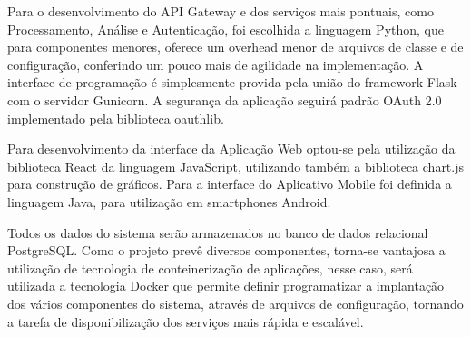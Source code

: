 Para o desenvolvimento do API Gateway e dos serviços mais pontuais, como Processamento, Análise e Autenticação, foi escolhida a linguagem Python, que para componentes menores, oferece um overhead menor de arquivos de classe e de configuração, conferindo um pouco mais de agilidade na implementação. A interface de programação é simplesmente provida pela união do framework Flask com o servidor Gunicorn. A segurança da aplicação seguirá padrão OAuth 2.0 implementado pela biblioteca oauthlib.


Para desenvolvimento da interface da Aplicação Web optou-se pela utilização da biblioteca React da linguagem JavaScript, utilizando também a biblioteca chart.js para construção de gráficos. Para a interface do Aplicativo Mobile foi definida a linguagem Java, para utilização em smartphones Android. 


Todos os dados do sistema serão armazenados no banco de dados relacional PostgreSQL. Como o projeto prevê diversos componentes, torna-se vantajosa a utilização de tecnologia de conteinerização de aplicações, nesse caso, será utilizada a tecnologia Docker que permite definir programatizar a implantação dos vários componentes do sistema, através de arquivos de configuração, tornando a tarefa de disponibilização dos serviços mais rápida e escalável.




